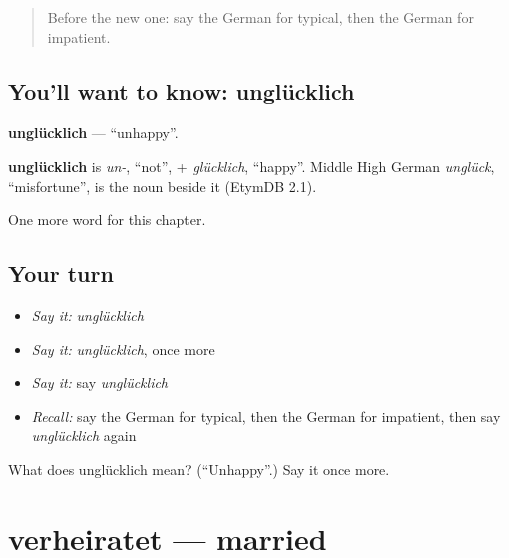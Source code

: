 \label{lesson:GE-C223-ungluecklich}



\begin{quote}
Before the new one: say the German for typical, then the German for impatient.
\end{quote}

\subsection*{You'll want to know: unglücklich}
\textbf{unglücklich} — \textquotedblleft{}unhappy\textquotedblright{}.

\begin{cousinweb}
\textbf{unglücklich} is \emph{un-}, \textquotedblleft{}not\textquotedblright{}, + \emph{glücklich}, \textquotedblleft{}happy\textquotedblright{}. Middle High German \emph{unglück}, \textquotedblleft{}misfortune\textquotedblright{}, is the noun beside it (EtymDB 2.1).
\end{cousinweb}

\begin{grammarlens}[title={What you've built}]
One more word for this chapter.
\end{grammarlens}

\subsection*{Your turn}
\begin{itemize}
\raggedright
  \item \emph{Say it:} \emph{unglücklich}
  \item \emph{Say it:} \emph{unglücklich}, once more
  \item \emph{Say it:} say \emph{unglücklich}
  \item \emph{Recall:} say the German for typical, then the German for impatient, then say \emph{unglücklich} again
\end{itemize}

\begin{tcolorbox}[breakable,colback=teal!4,colframe=teal!35!black,title={Before you move on}]
What does unglücklich mean? (\textquotedblleft{}Unhappy\textquotedblright{}.) Say it once more.
\end{tcolorbox}
\section[verheiratet]{verheiratet — married}

